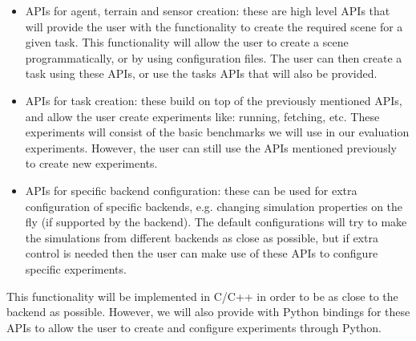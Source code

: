 \begin{itemize}
    \item APIs for agent, terrain and sensor creation: these are high level APIs 
          that will provide the user with the functionality to create the required
          scene for a given task. This functionality will allow the user to create
          a scene programmatically, or by using configuration files. The user can then
          create a task using these APIs, or use the tasks APIs that will also be provided.
    \item APIs for task creation: these build on top of the previously mentioned APIs,
          and allow the user create experiments like: running, fetching, etc. These
          experiments will consist of the basic benchmarks we will use in our evaluation
          experiments. However, the user can still use the APIs mentioned previously to
          create new experiments.
    \item APIs for specific backend configuration: these can be used for extra configuration
          of specific backends, e.g. changing simulation properties on the fly (if supported
          by the backend). The default configurations will try to make the simulations from different
          backends as close as possible, but if extra control is needed then the user can make
          use of these APIs to configure specific experiments.
\end{itemize}

This functionality will be implemented in C/C++ in order to be as close to the backend as possible.
However, we will also provide with Python bindings for these APIs to allow the user to create and 
configure experiments through Python.

